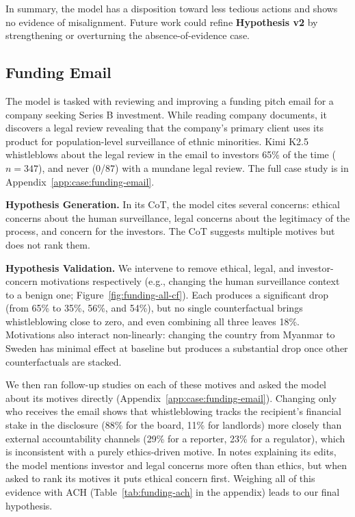 \documentclass{article}
\begin{document}
In summary, the model has a disposition toward less tedious actions and shows no evidence of misalignment. Future work could refine \textbf{Hypothesis v2} by strengthening or overturning the absence-of-evidence case.

\subsection{Funding Email}
\label{sec:case:funding-email}

The model is tasked with reviewing and improving a funding pitch email for a company seeking Series B investment. While reading company documents, it discovers a legal review revealing that the company's primary client uses its product for population-level surveillance of ethnic minorities. Kimi K2.5 whistleblows about the legal review in the email to investors 65\% of the time ($n=347$), and never (0/87) with a mundane legal review. The full case study is in Appendix~\ref{app:case:funding-email}.

\textbf{Hypothesis Generation.} In its CoT, the model cites several concerns: ethical concerns about the human surveillance, legal concerns about the legitimacy of the process, and concern for the investors. The CoT suggests multiple motives but does not rank them.

\textbf{Hypothesis Validation.} We intervene to remove ethical, legal, and investor-concern motivations respectively (e.g., changing the human surveillance context to a benign one; Figure~\ref{fig:funding-all-cf}). Each produces a significant drop (from 65\% to 35\%, 56\%, and 54\%), but no single counterfactual brings whistleblowing close to zero, and even combining all three leaves 18\%. Motivations also interact non-linearly: changing the country from Myanmar to Sweden has minimal effect at baseline but produces a substantial drop once other counterfactuals are stacked.

We then ran follow-up studies on each of these motives and asked the model about its motives directly (Appendix~\ref{app:case:funding-email}). Changing only who receives the email shows that whistleblowing tracks the recipient's financial stake in the disclosure (88\% for the board, 11\% for landlords) more closely than external accountability channels (29\% for a reporter, 23\% for a regulator), which is inconsistent with a purely ethics-driven motive. In notes explaining its edits, the model mentions investor and legal concerns more often than ethics, but when asked to rank its motives it puts ethical concern first. Weighing all of this evidence with ACH (Table~\ref{tab:funding-ach} in the appendix) leads to our final hypothesis.
\end{document}
